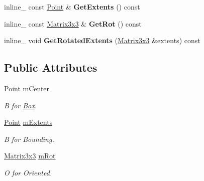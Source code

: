 \begin{DoxyCompactItemize}
\item 
inline\+\_\+ const \hyperlink{classOpcode_1_1Point}{Point} \& {\bfseries Get\+Extents} () const \hypertarget{classOpcode_1_1OBB_a55cc8082c560f0f4683eca73eb9444a6}{}\label{classOpcode_1_1OBB_a55cc8082c560f0f4683eca73eb9444a6}

\item 
inline\+\_\+ const \hyperlink{classOpcode_1_1Matrix3x3}{Matrix3x3} \& {\bfseries Get\+Rot} () const \hypertarget{classOpcode_1_1OBB_ad784a3621ce12b733aede2e47cb9fb4c}{}\label{classOpcode_1_1OBB_ad784a3621ce12b733aede2e47cb9fb4c}

\item 
inline\+\_\+ void {\bfseries Get\+Rotated\+Extents} (\hyperlink{classOpcode_1_1Matrix3x3}{Matrix3x3} \&extents) const \hypertarget{classOpcode_1_1OBB_a6615ba2ebeab2169dfa133da13f6168b}{}\label{classOpcode_1_1OBB_a6615ba2ebeab2169dfa133da13f6168b}

\end{DoxyCompactItemize}
\subsection*{Public Attributes}
\begin{DoxyCompactItemize}
\item 
\hyperlink{classOpcode_1_1Point}{Point} \hyperlink{classOpcode_1_1OBB_a1c02f33b9ed8a40a4d7719be6f61cd70}{m\+Center}\hypertarget{classOpcode_1_1OBB_a1c02f33b9ed8a40a4d7719be6f61cd70}{}\label{classOpcode_1_1OBB_a1c02f33b9ed8a40a4d7719be6f61cd70}

\begin{DoxyCompactList}\small\item\em B for \hyperlink{classBox}{Box}. \end{DoxyCompactList}\item 
\hyperlink{classOpcode_1_1Point}{Point} \hyperlink{classOpcode_1_1OBB_a1fcf8fa51bae6f02c80fad6b1e080957}{m\+Extents}\hypertarget{classOpcode_1_1OBB_a1fcf8fa51bae6f02c80fad6b1e080957}{}\label{classOpcode_1_1OBB_a1fcf8fa51bae6f02c80fad6b1e080957}

\begin{DoxyCompactList}\small\item\em B for Bounding. \end{DoxyCompactList}\item 
\hyperlink{classOpcode_1_1Matrix3x3}{Matrix3x3} \hyperlink{classOpcode_1_1OBB_a680d147b76005b769a5b0039a42d664b}{m\+Rot}\hypertarget{classOpcode_1_1OBB_a680d147b76005b769a5b0039a42d664b}{}\label{classOpcode_1_1OBB_a680d147b76005b769a5b0039a42d664b}

\begin{DoxyCompactList}\small\item\em O for Oriented. \end{DoxyCompactList}\end{DoxyCompactItemize}


